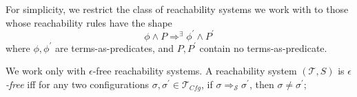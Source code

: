 

\begin{remark}\label{rem:shapeOfReachabilityRules}
For simplicity, we restrict the class of reachability systems we work with to those whose reachability rules
have the shape
\begin{equation*}
    \phi \land P \Rightarrow^\exists \phi^\prime \land P^\prime
\end{equation*}
where $\phi,\phi^\prime$ are terms-as-predicates, and $P,P^\prime$ contain no terms-as-predicate.
\end{remark}

\begin{remark}\label{rem:noEmptySteps}
We work only with $\epsilon$-free reachability systems.
A reachability system $(\mathcal{T}, S)$ is \emph{$\epsilon$-free}
iff for any two configurations $\sigma, \sigma^\prime \in \mathcal{T}_{\mathit{Cfg}}$, if
$\sigma \Rightarrow_{\mathcal{S}} \sigma^\prime$, then $\sigma \not = \sigma^\prime$;
\end{remark}